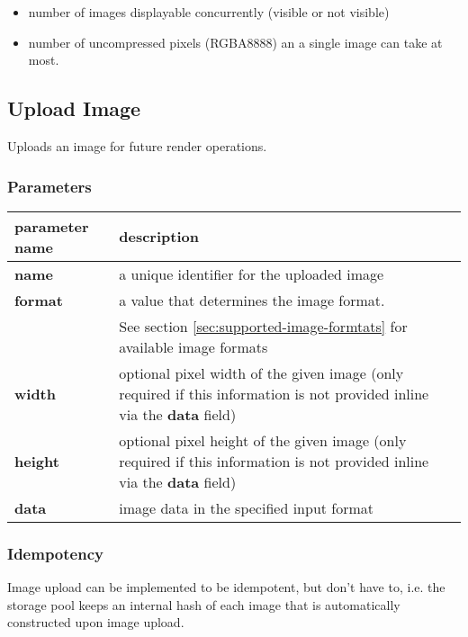 \documentclass[a4paper]{article}
\begin{document}
\begin{itemize}
    \item number of images displayable concurrently (visible or not visible)
    \item number of uncompressed pixels (RGBA8888) an a single image can take at most.
\end{itemize}

\subsection{Upload Image} %

Uploads an image for future render operations.

\subsubsection*{Parameters}

\begin{tabular}{|l|l|l|}
  \hline
  \textbf{parameter name} & \textbf{description} \\
  \hline
  \textbf{name}           & a unique identifier for the uploaded image \\
  \textbf{format}         & a value that determines the image format. \\
                          & See section \ref{sec:supported-image-formtats} for available image formats \\
  \textbf{width}          & optional pixel width of the given image
                            (only required if this information is not provided
                            inline via the \textbf{data} field) \\
  \textbf{height}         & optional pixel height of the given image
                            (only required if this information is not provided
                            inline via the \textbf{data} field) \\
  \textbf{data}           & image data in the specified input format \\
  \hline
\end{tabular}

\subsubsection{Idempotency}

Image upload can be implemented to be idempotent, but don't have to,
i.e. the storage pool keeps an internal hash of each image that is
automatically constructed upon image upload.
\end{document}
